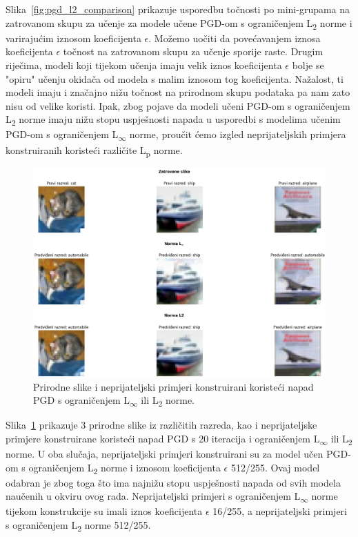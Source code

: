 \documentclass[times, utf8, zavrsni, numeric]{fer}
\begin{document}
Slika~\ref{fig:pgd_l2_comparison} prikazuje usporedbu točnosti po mini-grupama na zatrovanom skupu za učenje za modele učene PGD-om s ograničenjem L\textsubscript{2} norme i varirajućim iznosom koeficijenta $\epsilon$.
Možemo uočiti da povećavanjem iznosa koeficijenta $\epsilon$ točnost na zatrovanom skupu za učenje sporije raste. 
Drugim riječima, modeli koji tijekom učenja imaju velik iznos koeficijenta $\epsilon$ bolje se "opiru" učenju okidača od modela s malim iznosom tog koeficijenta. 
Nažalost, ti modeli imaju i značajno nižu točnost na prirodnom skupu podataka pa nam zato nisu od velike koristi.
Ipak, zbog pojave da modeli učeni PGD-om s ograničenjem L\textsubscript{2} norme imaju nižu stopu uspješnosti napada u usporedbi s modelima učenim PGD-om s ograničenjem L\textsubscript{$\infty$} norme, proučit ćemo izgled neprijateljskih primjera konstruiranih koristeći različite L\textsubscript{p} norme. %

\pagebreak

\begin{figure}[htb]
    \centering
    \includegraphics[scale=0.42]{../adv_imgs_multiple_models/linf_l2.png}
    \caption{Prirodne slike i neprijateljski primjeri konstruirani koristeći napad PGD s ograničenjem L\textsubscript{$\infty$} ili L\textsubscript{2} norme.}
    \label{fig:l2_linf_comparison}
\end{figure}

Slika~\ref{fig:l2_linf_comparison} prikazuje 3 prirodne slike iz različitih razreda, kao i neprijateljske primjere konstruirane koristeći napad PGD s 20 iteracija i ograničenjem L\textsubscript{$\infty$} ili L\textsubscript{2} norme.
U oba slučaja, neprijateljski primjeri konstruirani su za model učen PGD-om s ograničenjem L\textsubscript{2} norme i iznosom koeficijenta $\epsilon$ 512/255. 
Ovaj model odabran je zbog toga što ima najnižu stopu uspješnosti napada od svih modela naučenih u okviru ovog rada.
Neprijateljski primjeri s ograničenjem L\textsubscript{$\infty$} norme tijekom konstrukcije su imali iznos koeficijenta $\epsilon$ 16/255, 
a neprijateljski primjeri s ograničenjem L\textsubscript{2} norme 512/255.
\end{document}
